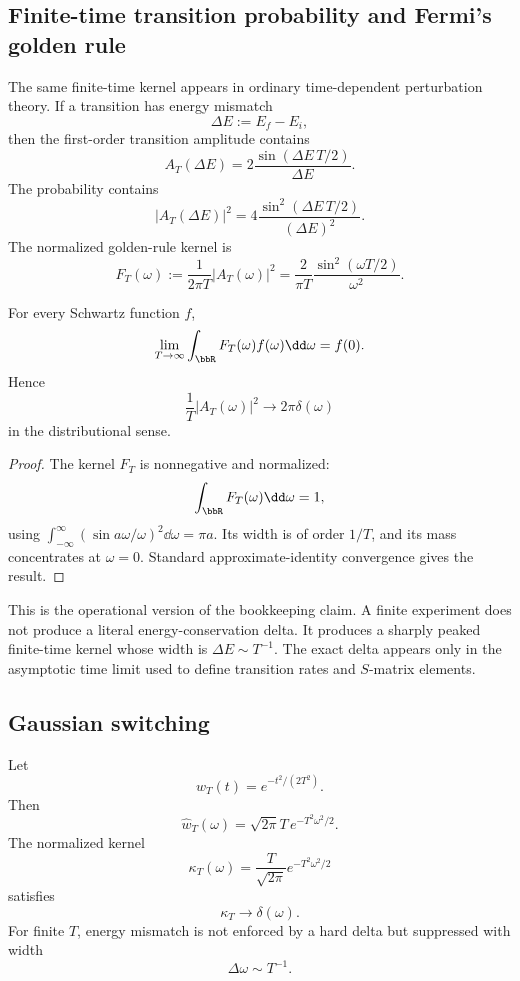 \documentclass[11pt]{article}
\begin{document}
\subsection{Finite-time transition probability and Fermi's golden rule}

The same finite-time kernel appears in ordinary time-dependent perturbation theory.  If a transition has energy mismatch
\[
\Delta E:=E_f-E_i,
\]
then the first-order transition amplitude contains
\[
A_T(\Delta E)=2\frac{\sin(\Delta E\,T/2)}{\Delta E}.
\]
The probability contains
\[
|A_T(\Delta E)|^2
=
4\frac{\sin^2(\Delta E\,T/2)}{(\Delta E)^2}.
\]
The normalized golden-rule kernel is
\[
F_T(\omega):=\frac{1}{2\pi T}|A_T(\omega)|^2
=
\frac{2}{\pi T}\frac{\sin^2(\omega T/2)}{\omega^2}.
\]

\begin{proposition}
For every Schwartz function \(f\),
\[
\lim_{T\to\infty}\int_{\bbR}F_T(\omega)f(\omega)\dd\omega=f(0).
\]
Hence
\[
\frac{1}{T}|A_T(\omega)|^2\to 2\pi\delta(\omega)
\]
in the distributional sense.
\end{proposition}

\begin{proof}
The kernel \(F_T\) is nonnegative and normalized:
\[
\int_{\bbR}F_T(\omega)\dd\omega=1,
\]
using \(\int_{-\infty}^{\infty}(\sin a\omega/\omega)^2\dd\omega=\pi a\).  Its width is of order \(1/T\), and its mass concentrates at \(\omega=0\).  Standard approximate-identity convergence gives the result.
\end{proof}

This is the operational version of the bookkeeping claim.  A finite experiment does not produce a literal energy-conservation delta.  It produces a sharply peaked finite-time kernel whose width is \(\Delta E\sim T^{-1}\).  The exact delta appears only in the asymptotic time limit used to define transition rates and \(S\)-matrix elements.

\subsection{Gaussian switching}

Let
\[
w_T(t)=e^{-t^2/(2T^2)}.
\]
Then
\[
\widehat w_T(\omega)=\sqrt{2\pi}T\,e^{-T^2\omega^2/2}.
\]
The normalized kernel
\[
\kappa_T(\omega)=\frac{T}{\sqrt{2\pi}}e^{-T^2\omega^2/2}
\]
satisfies
\[
\kappa_T\to\delta(\omega).
\]
For finite \(T\), energy mismatch is not enforced by a hard delta but suppressed with width
\[
\Delta\omega\sim T^{-1}.
\]
\end{document}
